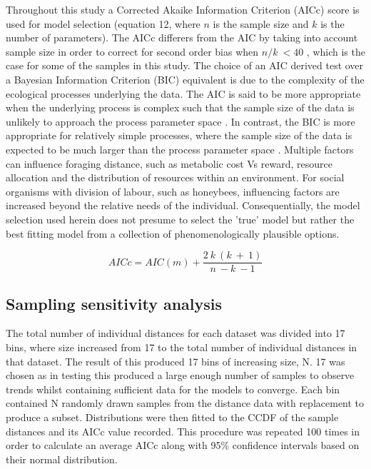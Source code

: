\documentclass[11pt]{article}
\begin{document}
\begin{linenumbers}
Throughout this study a Corrected Akaike Information Criterion (AICc) score is used for model selection (equation 12, where $n$ is the sample size and $k$ is the number of parameters). The AICc differers from the AIC by taking into account sample size in order to correct for second order bias when $n/k\ < 40$ \citep{Burnham2004}, which is the case for some of the samples in this study. The choice of an AIC derived test over a Bayesian Information Criterion (BIC) equivalent is due to the complexity of the ecological processes underlying the data. The AIC is said to be more appropriate  when the underlying process is complex such that the sample size of the data is unlikely to approach the process parameter space \citep{Aho2014}. In contrast, the BIC is more appropriate for relatively simple processes, where the sample size of the data is expected to be much larger than the process parameter space \citep{Aho2014}. Multiple factors can influence foraging distance, such as metabolic cost Vs reward, resource allocation and the distribution of resources within an environment. For social organisms with division of labour, such as honeybees, influencing factors are increased beyond the relative needs of the individual. Consequentially, the model selection used herein does not presume to select the 'true' model but rather the best fitting model from a collection of phenomenologically plausible options. 

\begin{equation}
AICc = AIC(m) + \frac{2\ k\ (k\ +\ 1)}{n\ - k\ - 1}
\end{equation}

\subsection{Sampling sensitivity analysis}
The total number of individual distances for each dataset was divided into 17 bins, where size increased from 17 to the total number of individual distances in that dataset. The result of this produced 17 bins of increasing size, N. 17 was chosen as in testing this produced a large enough number of samples to observe trends whilst containing sufficient data for the models to converge. Each bin contained N randomly drawn samples from the distance data with replacement to produce a subset. Distributions were then fitted to the CCDF of the sample distances and its AICc value recorded. This procedure was repeated 100 times in order to calculate an average AICc along with 95\% confidence intervals based on their normal distribution.


\end{linenumbers}
\end{document}
